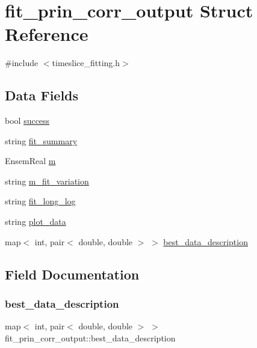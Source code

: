 \hypertarget{structfit__prin__corr__output}{}\section{fit\+\_\+prin\+\_\+corr\+\_\+output Struct Reference}
\label{structfit__prin__corr__output}


{\ttfamily \#include $<$timeslice\+\_\+fitting.\+h$>$}

\subsection*{Data Fields}
\begin{DoxyCompactItemize}
\item 
bool \mbox{\hyperlink{structfit__prin__corr__output_acc7f5ba3e169a82e1b2ceb2cfc4865f9}{success}}
\item 
string \mbox{\hyperlink{structfit__prin__corr__output_a1f94548ccff9e3eca4da32d40f64344d}{fit\+\_\+summary}}
\item 
Ensem\+Real \mbox{\hyperlink{structfit__prin__corr__output_a4c7686536df75e4e06474ea4fdab4031}{m}}
\item 
string \mbox{\hyperlink{structfit__prin__corr__output_aa1d886fe746e66f3fad176ace165f22e}{m\+\_\+fit\+\_\+variation}}
\item 
string \mbox{\hyperlink{structfit__prin__corr__output_a72eb4141f498a79f7017c765c65574a7}{fit\+\_\+long\+\_\+log}}
\item 
string \mbox{\hyperlink{structfit__prin__corr__output_aa13595cad65eaa412394974801a1a1dd}{plot\+\_\+data}}
\item 
map$<$ int, pair$<$ double, double $>$ $>$ \mbox{\hyperlink{structfit__prin__corr__output_a704c93e4750922ec8bc084f6832ba0aa}{best\+\_\+data\+\_\+description}}
\end{DoxyCompactItemize}


\subsection{Field Documentation}
\mbox{\label{structfit__prin__corr__output_a704c93e4750922ec8bc084f6832ba0aa}} 
\subsubsection{\texorpdfstring{best\_data\_description}{best\_data\_description}}
{\footnotesize\ttfamily map$<$ int, pair$<$ double, double $>$ $>$ fit\+\_\+prin\+\_\+corr\+\_\+output\+::best\+\_\+data\+\_\+description}

